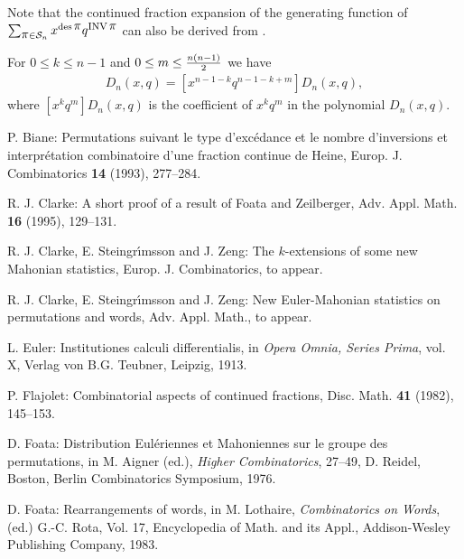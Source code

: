 Note that the continued fraction expansion of the generating function
of\\ $\sum_{\mbox{$\pi$} \in {\cal S}_n}x^{\mathop{\rm des} \mbox{$\pi$}}q^{\mathop{\mbox{\sc inv}}\nolimits \mbox{$\pi$}}$ can also be derived
from \cite[Theorem 6.5]{medvie}.

\begin{cor} For $0\leq k\leq n-1$ and $0\leq m\leq {n(n-1)\over 2}$ we have
\begin{eqnarray}
[x^kq^{k+m}]D_n(x,q)=[x^{n-1-k}q^{n-1-k+m}]D_n(x,q),\label{dualitycor}
\end{eqnarray}
where $[x^kq^m]D_n(x,q)$ is the coefficient of $x^kq^m$ in the polynomial
$D_n(x,q)$.
\end{cor}

\begin{thebibliography}{99}
P. Biane: Permutations suivant le type d'exc\'edance et
  le nombre d'inversions et interpr\'etation combinatoire d'une
  fraction continue de Heine, Europ. J. Combinatorics {\bf 14} (1993),
  277--284.

 R. J. Clarke: A short proof of a result of Foata and
Zeilberger,
Adv. Appl. Math. {\bf 16} (1995), 129--131.

 R. J. Clarke, E. Steingr\'{\i}msson and J. Zeng: The
  $k$-extensions of some new Mahonian statistics,
  Europ. J. Combinatorics, to appear.

 R. J. Clarke, E. Steingr\'{\i}msson and J. Zeng: New
  Euler-Mahonian statistics on permutations and words, Adv. Appl.
  Math., to appear.

 L. Euler: Institutiones calculi differentialis, in {\em Opera
Omnia, Series Prima}, vol. X, Verlag von B.G. Teubner, Leipzig, 1913.

 P. Flajolet: Combinatorial aspects of continued fractions, Disc.
Math. {\bf 41} (1982), 145--153.

 D. Foata: Distribution Eul\'eriennes et Mahoniennes sur
  le groupe des permutations, in M. Aigner (ed.), {\em Higher
  Combinatorics}, 27--49, D. Reidel, Boston, Berlin Combinatorics
  Symposium, 1976.

 D. Foata: Rearrangements of words, in M. Lothaire, {\em
    Combinatorics on Words}, (ed.) G.-C. Rota, Vol. 17, Encyclopedia
  of Math.  and its Appl., Addison-Wesley Publishing Company, 1983.



\end{thebibliography}
